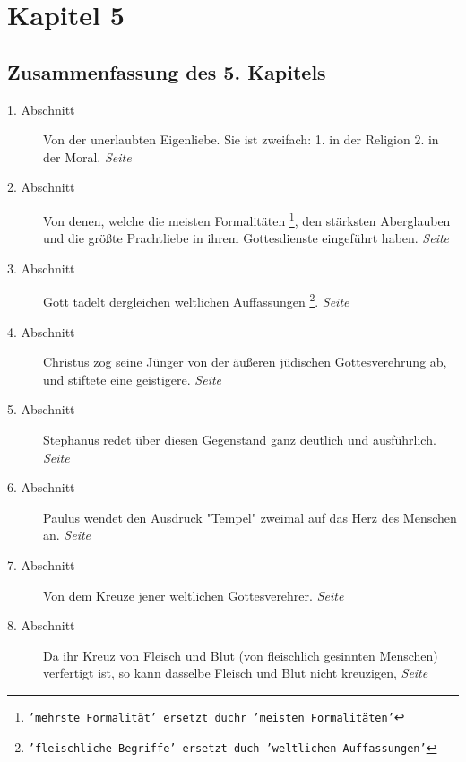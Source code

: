 

\chapter{Kapitel 5} \label{kap5}

\section{Zusammenfassung des 5. Kapitels}

\begin{description}
\item[1. Abschnitt] Von der unerlaubten Eigenliebe. Sie ist zweifach: 1. in der
Religion  2. in der Moral.
\dotfill \textit{Seite~\pageref{kap5_ab1}}\\
\item[2. Abschnitt] Von denen, welche die meisten Formalitäten
\footnote{\texttt{'mehrste Formalität' ersetzt duchr 'meisten Formalitäten'}}, den
stärksten
Aberglauben und die größte Prachtliebe in ihrem Gottesdienste eingeführt haben.
\dotfill \textit{Seite~\pageref{kap5_ab2}}\\
\item[3. Abschnitt] Gott tadelt dergleichen weltlichen Auffassungen
\footnote{\texttt{'fleischliche Begriffe' ersetzt duch 'weltlichen Auffassungen'}}.
\dotfill \textit{Seite~\pageref{kap5_ab3}}\\
\item[4. Abschnitt] Christus zog seine Jünger von der äußeren jüdischen
Gottesverehrung ab, und stiftete eine geistigere.
\dotfill \textit{Seite  \pageref{kap5_ab4}}\\
\item[5. Abschnitt] Stephanus redet über diesen Gegenstand ganz deutlich und
ausführlich.
\dotfill \textit{Seite  \pageref{kap5_ab5}}\\
\item[6. Abschnitt] Paulus wendet den Ausdruck "Tempel" zweimal auf das Herz des
Menschen an.
\dotfill \textit{Seite  \pageref{kap5_ab6}}\\
\item[7. Abschnitt] Von dem Kreuze jener weltlichen Gottesverehrer.
\dotfill \textit{Seite  \pageref{kap5_ab7}}\\
\item[8. Abschnitt] Da ihr Kreuz von Fleisch und Blut (von fleischlich gesinnten
Menschen) verfertigt ist, so kann dasselbe Fleisch und Blut nicht kreuzigen,
\dotfill \textit{Seite  \pageref{kap5_ab8}}\\

\end{description}

